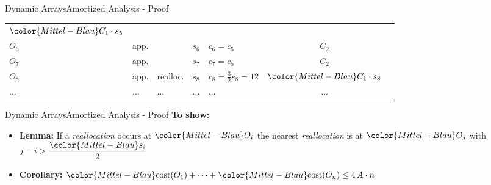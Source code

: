 \begin{frame}{Dynamic Arrays}{Amortized Analysis - Proof}
\begin{table}[!h]
\begin{tabular}{|l|l|l|l|l|c|@{}l}
      ${\color{Mittel-Blau}C_1 \cdot s_5}$ &
      \raisebox{-0.5em}{\multirow{3}{*}{%
        $\left.\begin{array}{@{}l@{}}\\[3.05em]\end{array}\right\rbrace
        \begin{array}{@{}l@{}}
          \text{distance}\\
           3\geq\left\lfloor\dfrac{{\color{Mittel-Blau}s_5}}{2}\right\rfloor
        \end{array}$%
      }}\\
      $O_6$ &app.& {} & $s_6$ & $c_6 = c_5$ & $C_2$\\
      $O_7$ &app.& {} & $s_7$ & $c_7 = c_5$ & $C_2$\\
      \cline{1-6}
      $O_8$ &app.& {\color{Mittel-Blau}realloc.} &
      $s_8$ & {\color{Mittel-Blau}$c_8 = \frac{3}{2} s_8=12$} &
      ${\color{Mittel-Blau}C_1 \cdot s_8}$\\
      $\dots$ & $\dots$ & $\dots$ & $\dots$ & $\dots$& $\dots$\\
      \cline{1-6}
    \end{tabular}
  \end{table}
\end{frame}


\begin{frame}{Dynamic Arrays}{Amortized Analysis - Proof}
  \textbf{To show:}
  \begin{itemize}
    \item
      \textbf{Lemma:}
      If a \textit{reallocation} occurs at ${\color{Mittel-Blau}O_i}$
      the nearest \textit{reallocation} is at ${\color{Mittel-Blau}O_j}$
      with $j - i > \dfrac{{\color{Mittel-Blau}s_i}}{2}$
    \item
      \textbf{Corollary:}
      ${\color{Mittel-Blau}\mathrm{cost}(O_1)}+\dots
        +{\color{Mittel-Blau}\mathrm{cost}(O_n)} \leq 4 \, A \cdot n$
  \end{itemize}
\end{frame}


